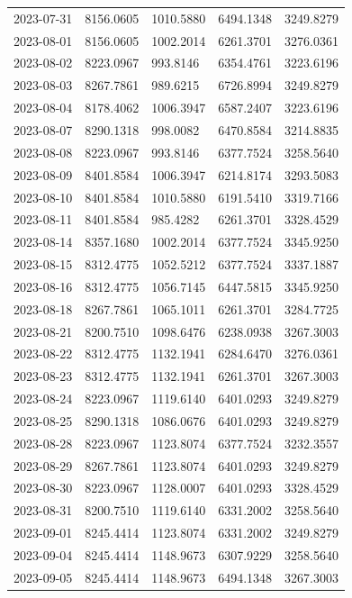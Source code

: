 \begin{footnotesize}
\begin{longtable}{lllll}
2023-07-31 & 8156.0605 & 1010.5880 & 6494.1348 & 3249.8279 \\
2023-08-01 & 8156.0605 & 1002.2014 & 6261.3701 & 3276.0361 \\
2023-08-02 & 8223.0967 & 993.8146 & 6354.4761 & 3223.6196 \\
2023-08-03 & 8267.7861 & 989.6215 & 6726.8994 & 3249.8279 \\
2023-08-04 & 8178.4062 & 1006.3947 & 6587.2407 & 3223.6196 \\
2023-08-07 & 8290.1318 & 998.0082 & 6470.8584 & 3214.8835 \\
2023-08-08 & 8223.0967 & 993.8146 & 6377.7524 & 3258.5640 \\
2023-08-09 & 8401.8584 & 1006.3947 & 6214.8174 & 3293.5083 \\
2023-08-10 & 8401.8584 & 1010.5880 & 6191.5410 & 3319.7166 \\
2023-08-11 & 8401.8584 & 985.4282 & 6261.3701 & 3328.4529 \\
2023-08-14 & 8357.1680 & 1002.2014 & 6377.7524 & 3345.9250 \\
2023-08-15 & 8312.4775 & 1052.5212 & 6377.7524 & 3337.1887 \\
2023-08-16 & 8312.4775 & 1056.7145 & 6447.5815 & 3345.9250 \\
2023-08-18 & 8267.7861 & 1065.1011 & 6261.3701 & 3284.7725 \\
2023-08-21 & 8200.7510 & 1098.6476 & 6238.0938 & 3267.3003 \\
2023-08-22 & 8312.4775 & 1132.1941 & 6284.6470 & 3276.0361 \\
2023-08-23 & 8312.4775 & 1132.1941 & 6261.3701 & 3267.3003 \\
2023-08-24 & 8223.0967 & 1119.6140 & 6401.0293 & 3249.8279 \\
2023-08-25 & 8290.1318 & 1086.0676 & 6401.0293 & 3249.8279 \\
2023-08-28 & 8223.0967 & 1123.8074 & 6377.7524 & 3232.3557 \\
2023-08-29 & 8267.7861 & 1123.8074 & 6401.0293 & 3249.8279 \\
2023-08-30 & 8223.0967 & 1128.0007 & 6401.0293 & 3328.4529 \\
2023-08-31 & 8200.7510 & 1119.6140 & 6331.2002 & 3258.5640 \\
2023-09-01 & 8245.4414 & 1123.8074 & 6331.2002 & 3249.8279 \\
2023-09-04 & 8245.4414 & 1148.9673 & 6307.9229 & 3258.5640 \\
2023-09-05 & 8245.4414 & 1148.9673 & 6494.1348 & 3267.3003 \\

\end{longtable}
\end{footnotesize}
